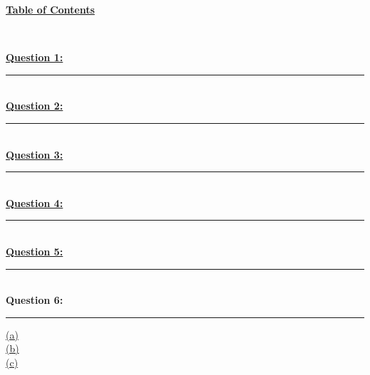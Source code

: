 \documentclass[12pt]{article}
\begin{document}
\begin{center}
	\hypertarget{toc}{\LARGE \underline{\textbf{Table of Contents}}}\\
\end{center}

\hyperlink{1}{\textbf{Question 1:}}
\vspace{1mm}
\hrule
~\\

\hyperlink{2}{\textbf{Question 2:}}
\vspace{1mm}
\hrule
~\\

\hyperlink{3}{\textbf{Question 3:}}
\vspace{1mm}
\hrule
~\\

\hyperlink{4}{\textbf{Question 4:}}
\vspace{1mm}
\hrule
~\\

\hyperlink{5}{\textbf{Question 5:}}
\vspace{1mm}
\hrule
~\\

{\textbf{Question 6:}}
\vspace{1mm}
\hrule
\vspace{1mm}
\hyperlink{6.1}{(a)}\\
\hyperlink{6.2}{(b)}\\
\hyperlink{6.3}{(c)}\\
~\\

\newpage
\end{document}
